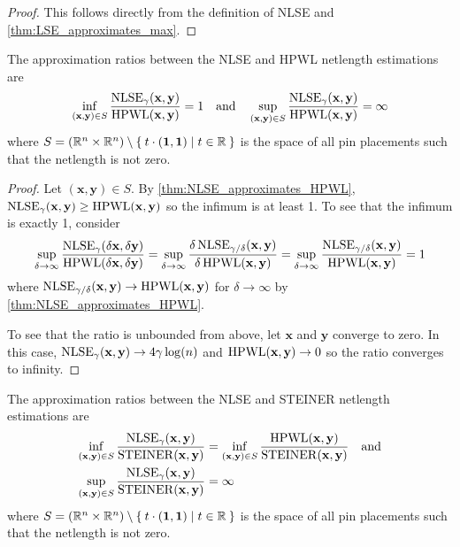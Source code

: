 \begin{proof}
 This follows directly from the definition of NLSE and \cref{thm:LSE_approximates_max}.
\end{proof}


\begin{theorem} \label{thm:NLSE_HPWL_approximation_ratios}
 The approximation ratios between the NLSE and HPWL netlength estimations are
 \[ 
  \inf_{(\mathbf{x}, \mathbf{y}) \in S} \frac{\operatorname{NLSE}_\gamma(\mathbf{x}, \mathbf{y})}{\operatorname{HPWL}(\mathbf{x}, \mathbf{y})} = 1 
  \quad \text{and} \quad 
  \sup_{(\mathbf{x}, \mathbf{y}) \in S} \frac{\operatorname{NLSE}_\gamma(\mathbf{x}, \mathbf{y})}{\operatorname{HPWL}(\mathbf{x}, \mathbf{y})} = \infty
 \]
 where \(S = (\mathbb{R}^n \times \mathbb{R}^n) \setminus \Set{ t \cdot (\mathbf{1}, \mathbf{1}) | t \in \mathbb{R}} \)
 is the space of all pin placements such that the netlength is not zero.
\end{theorem}

\begin{proof}
 Let \((\mathbf{x}, \mathbf{y}) \in S \).
 By \cref{thm:NLSE_approximates_HPWL}, \(\operatorname{NLSE}_\gamma (\mathbf{x}, \mathbf{y}) \geq \operatorname{HPWL} (\mathbf{x}, \mathbf{y})\)
 so the infimum is at least 1.
 To see that the infimum is exactly 1, consider
 \[
      \sup_{\delta \to \infty} \frac{\operatorname{NLSE}_\gamma (\delta \mathbf{x}, \delta \mathbf{y})}{\operatorname{HPWL} (\delta \mathbf{x}, \delta \mathbf{y})} 
    = \sup_{\delta \to \infty} \frac{\delta \operatorname{NLSE}_{\gamma/\delta} (\mathbf{x}, \mathbf{y})}{\delta \operatorname{HPWL} (\mathbf{x}, \mathbf{y})}
    = \sup_{\delta \to \infty} \frac{\operatorname{NLSE}_{\gamma/\delta} (\mathbf{x}, \mathbf{y})}{\operatorname{HPWL} (\mathbf{x}, \mathbf{y})}
    = 1
 \]
 where \(\operatorname{NLSE}_{\gamma/\delta} (\mathbf{x}, \mathbf{y}) \to \operatorname{HPWL} (\mathbf{x}, \mathbf{y})\) for \(\delta \to \infty\) by \cref{thm:NLSE_approximates_HPWL}.
 
 To see that the ratio is unbounded from above, let \(\mathbf{x}\) and \(\mathbf{y}\) converge to zero.
 In this case, \(\operatorname{NLSE}_\gamma(\mathbf{x}, \mathbf{y}) \to 4 \gamma \log(n)\) and \(\operatorname{HPWL}(\mathbf{x}, \mathbf{y}) \to 0\) so the 
 ratio converges to infinity.
\end{proof}


\begin{theorem} \label{thm:NLSE_STEINER_approximation_ratios}
 The approximation ratios between the NLSE and STEINER netlength estimations are
 \begin{align*}
  \inf_{(\mathbf{x}, \mathbf{y}) \in S} \frac{\operatorname{NLSE}_\gamma(\mathbf{x}, \mathbf{y})}{\operatorname{STEINER}(\mathbf{x}, \mathbf{y})} &= \inf_{(\mathbf{x}, \mathbf{y}) \in S} \frac{\operatorname{HPWL}(\mathbf{x}, \mathbf{y})}{\operatorname{STEINER}(\mathbf{x}, \mathbf{y})} \quad \text{and}\\
  \sup_{(\mathbf{x}, \mathbf{y}) \in S} \frac{\operatorname{NLSE}_\gamma(\mathbf{x}, \mathbf{y})}{\operatorname{STEINER}(\mathbf{x}, \mathbf{y})} &= \infty
 \end{align*}
 where \(S = (\mathbb{R}^n \times \mathbb{R}^n) \setminus \Set{ t \cdot (\mathbf{1}, \mathbf{1}) | t \in \mathbb{R}} \)
 is the space of all pin placements such that the netlength is not zero.
\end{theorem}

